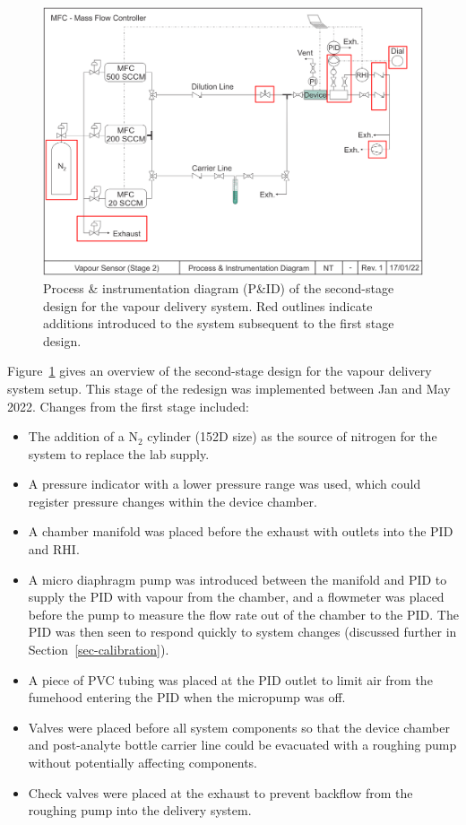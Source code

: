 \documentclass[
  a4paper,
]{scrbook}
\begin{document}
\begin{figure}

{\centering \includegraphics[width=1\textwidth,height=\textheight]{figures/ch5/PID_V2.png}

}

\caption{\label{fig-stage-2-pid}Process \& instrumentation diagram
(P\&ID) of the second-stage design for the vapour delivery system. Red
outlines indicate additions introduced to the system subsequent to the
first stage design.}

\end{figure}

Figure~\ref{fig-stage-2-pid} gives an overview of the second-stage
design for the vapour delivery system setup. This stage of the redesign
was implemented between Jan and May 2022. Changes from the first stage
included:

\begin{itemize}
\item
  The addition of a N\(_2\) cylinder (152D size) as the source of
  nitrogen for the system to replace the lab supply.
\item
  A pressure indicator with a lower pressure range was used, which could
  register pressure changes within the device chamber.
\item
  A chamber manifold was placed before the exhaust with outlets into the
  PID and RHI.
\item
  A micro diaphragm pump was introduced between the manifold and PID to
  supply the PID with vapour from the chamber, and a flowmeter was
  placed before the pump to measure the flow rate out of the chamber to
  the PID. The PID was then seen to respond quickly to system changes
  (discussed further in Section~\ref{sec-calibration}).
\item
  A piece of PVC tubing was placed at the PID outlet to limit air from
  the fumehood entering the PID when the micropump was off.
\item
  Valves were placed before all system components so that the device
  chamber and post-analyte bottle carrier line could be evacuated with a
  roughing pump without potentially affecting components.
\item
  Check valves were placed at the exhaust to prevent backflow from the
  roughing pump into the delivery system.
\end{itemize}
\end{document}
